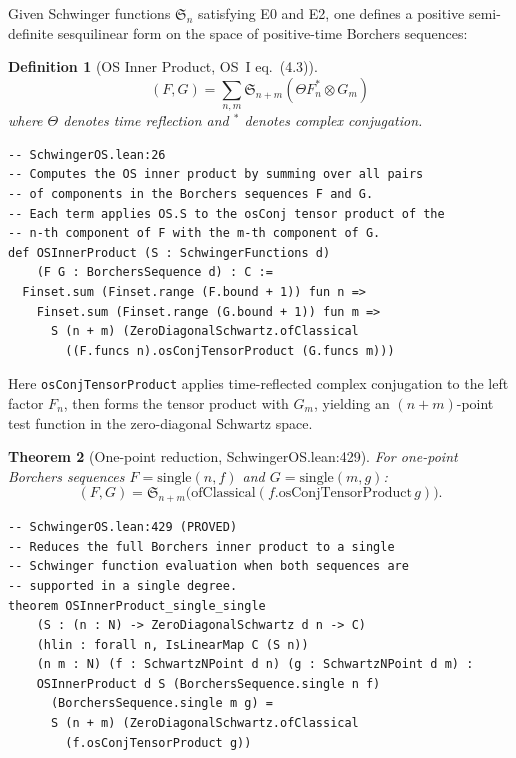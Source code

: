 \documentclass[11pt,a4paper]{article}
\newtheorem{theorem}{Theorem}[section]
\newtheorem{definition}[theorem]{Definition}
\begin{document}
Given Schwinger functions $\mathfrak{S}_n$ satisfying E0 and E2, one defines
a positive semi-definite sesquilinear form on the space of positive-time
Borchers sequences:

\begin{definition}[OS Inner Product, OS~I eq.~(4.3)]
\[
(F, G) = \sum_{n,m} \mathfrak{S}_{n+m}(\Theta F_n^* \otimes G_m)
\]
where $\Theta$ denotes time reflection and ${}^*$ denotes complex conjugation.
\end{definition}

\begin{lstlisting}
-- SchwingerOS.lean:26
-- Computes the OS inner product by summing over all pairs
-- of components in the Borchers sequences F and G.
-- Each term applies OS.S to the osConj tensor product of the
-- n-th component of F with the m-th component of G.
def OSInnerProduct (S : SchwingerFunctions d)
    (F G : BorchersSequence d) : C :=
  Finset.sum (Finset.range (F.bound + 1)) fun n =>
    Finset.sum (Finset.range (G.bound + 1)) fun m =>
      S (n + m) (ZeroDiagonalSchwartz.ofClassical
        ((F.funcs n).osConjTensorProduct (G.funcs m)))
\end{lstlisting}

\noindent Here \texttt{osConjTensorProduct} applies time-reflected complex
conjugation to the left factor $F_n$, then forms the tensor product with $G_m$,
yielding an $(n{+}m)$-point test function in the zero-diagonal Schwartz space.

\begin{theorem}[One-point reduction, SchwingerOS.lean:429]
For one-point Borchers sequences $F = \mathrm{single}(n, f)$ and
$G = \mathrm{single}(m, g)$:
\[
(F, G) = \mathfrak{S}_{n+m}\bigl(\mathrm{ofClassical}(f.\mathrm{osConjTensorProduct}\,g)\bigr).
\]
\end{theorem}

\begin{lstlisting}
-- SchwingerOS.lean:429 (PROVED)
-- Reduces the full Borchers inner product to a single
-- Schwinger function evaluation when both sequences are
-- supported in a single degree.
theorem OSInnerProduct_single_single
    (S : (n : N) -> ZeroDiagonalSchwartz d n -> C)
    (hlin : forall n, IsLinearMap C (S n))
    (n m : N) (f : SchwartzNPoint d n) (g : SchwartzNPoint d m) :
    OSInnerProduct d S (BorchersSequence.single n f)
      (BorchersSequence.single m g) =
      S (n + m) (ZeroDiagonalSchwartz.ofClassical
        (f.osConjTensorProduct g))
\end{lstlisting}
\end{document}
